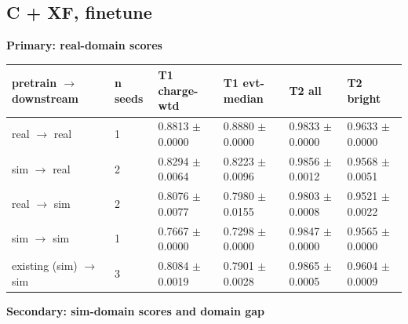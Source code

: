 \documentclass[10pt,a4paper]{article}
\begin{document}
\subsection{C + XF, finetune}
\textbf{Primary: real-domain scores}

\begin{center}\footnotesize
\setlength{\tabcolsep}{3pt}\renewcommand{\arraystretch}{1.15}
\begin{tabularx}{\linewidth}{LLLLLL}
\toprule
\textbf{pretrain $\rightarrow$ downstream} & \textbf{n seeds} & \textbf{T1 charge-wtd} & \textbf{T1 evt-median} & \textbf{T2 all} & \textbf{T2 bright} \\
\midrule
real $\rightarrow$ real & 1 & 0.8813 $\pm$ 0.0000 & 0.8880 $\pm$ 0.0000 & 0.9833 $\pm$ 0.0000 & 0.9633 $\pm$ 0.0000 \\
sim $\rightarrow$ real & 2 & 0.8294 $\pm$ 0.0064 & 0.8223 $\pm$ 0.0096 & 0.9856 $\pm$ 0.0012 & 0.9568 $\pm$ 0.0051 \\
real $\rightarrow$ sim & 2 & 0.8076 $\pm$ 0.0077 & 0.7980 $\pm$ 0.0155 & 0.9803 $\pm$ 0.0008 & 0.9521 $\pm$ 0.0022 \\
sim $\rightarrow$ sim & 1 & 0.7667 $\pm$ 0.0000 & 0.7298 $\pm$ 0.0000 & 0.9847 $\pm$ 0.0000 & 0.9565 $\pm$ 0.0000 \\
existing (sim) $\rightarrow$ sim & 3 & 0.8084 $\pm$ 0.0019 & 0.7901 $\pm$ 0.0028 & 0.9865 $\pm$ 0.0005 & 0.9604 $\pm$ 0.0009 \\
\bottomrule
\end{tabularx}
\end{center}
\textbf{Secondary: sim-domain scores and domain gap}
\end{document}
